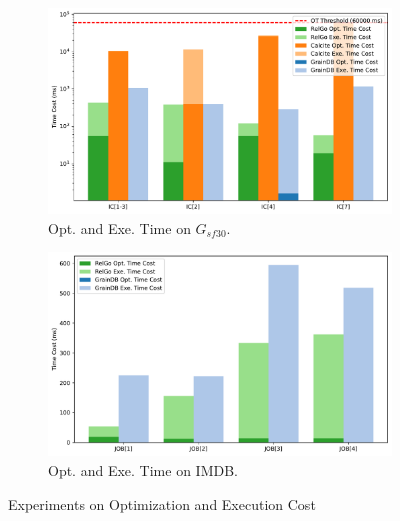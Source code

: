 \begin{figure}[ht]
    \centering
    \begin{subfigure}[b]{0.45\linewidth}
        \centering
        \includegraphics[width=\linewidth]{./figures/exp/opt_exe_ldbc.pdf}
        \caption{Opt. and Exe. Time on $G_{sf30}$.}
        \label{fig:exp-opt-ldbc}
    \end{subfigure}
    \begin{subfigure}[b]{0.45\linewidth}
        \centering
        \includegraphics[width=\linewidth]{./figures/exp/opt_exe_job.pdf}
        \caption{Opt. and Exe. Time on IMDB.}
        \label{fig:exp-opt-job}
    \end{subfigure}
    \caption{Experiments on Optimization and Execution Cost}
    \label{fig:exp-optimization}
\end{figure}


